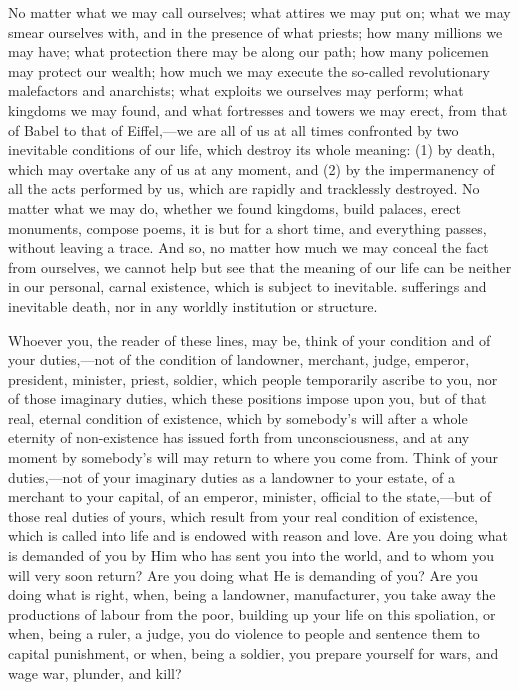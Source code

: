 \documentclass{book}
\begin{document}
No matter what we may call ourselves; what attires we may put on; what we may smear ourselves with, and in the presence of what priests; how many millions we may have; what protection there may be along our path; how many policemen may protect our wealth; how much we may execute the so-called revolutionary malefactors and anarchists; what exploits we ourselves may perform; what kingdoms we may found, and what fortresses and towers we may erect, from that of Babel to that of Eiffel,—we are all of us at all times confronted by two inevitable conditions of our life, which destroy its whole meaning: (1) by death, which may overtake any of us at any moment, and (2) by the impermanency of all the acts performed by us, which are rapidly and tracklessly destroyed. No matter what we may do, whether we found kingdoms, build palaces, erect monuments, compose poems, it is but for a short time, and everything passes, without leaving a trace. And so, no matter how much we may conceal the fact from ourselves, we cannot help but see that the meaning of our life can be neither in our personal, carnal existence, which is subject to inevitable. sufferings and inevitable death, nor in any worldly institution or structure.

Whoever you, the reader of these lines, may be, think of your condition and of your duties,—not of the condition of landowner, merchant, judge, emperor, president, minister, priest, soldier, which people temporarily ascribe to you, nor of those imaginary duties, which these positions impose upon you, but of that real, eternal condition of existence, which by somebody’s will after a whole eternity of non-existence has issued forth from unconsciousness, and at any moment by somebody’s will may return to where you come from. Think of your duties,—not of your imaginary duties as a landowner to your estate, of a merchant to your capital, of an emperor, minister, official to the state,—but of those real duties of yours, which result from your real condition of existence, which is called into life and is endowed with reason and love. Are you doing what is demanded of you by Him who has sent you into the world, and to whom you will very soon return? Are you doing what He is demanding of you? Are you doing what is right, when, being a landowner, manufacturer, you take away the productions of labour from the poor, building up your life on this spoliation, or when, being a ruler, a judge, you do violence to people and sentence them to capital punishment, or when, being a soldier, you prepare yourself for wars, and wage war, plunder, and kill?
\end{document}
